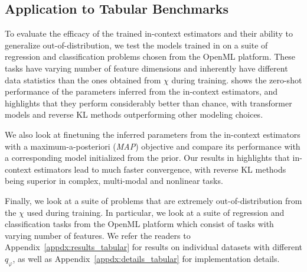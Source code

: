 \vspace{-3mm}
\subsection{Application to Tabular Benchmarks}
\vspace{-1mm}
\label{subsec:tabular}
To evaluate the efficacy of the trained in-context estimators and their ability to generalize out-of-distribution, we test the models trained in  on a suite of regression and classification problems chosen from the OpenML platform. These tasks have varying number of feature dimensions and inherently have different data statistics than the ones obtained from $\chi$ during training.  shows the zero-shot performance of the parameters inferred from the in-context estimators, and highlights that they perform considerably better than chance, with transformer models and reverse KL methods outperforming other modeling choices.

We also look at finetuning the inferred parameters from the in-context estimators with a maximum-a-posteriori (\textit{MAP}) objective and compare its performance with a corresponding model initialized from the prior. Our results in  highlights that in-context estimators lead to much faster convergence, with reverse KL methods being superior in complex, multi-modal and nonlinear tasks.

\begin{table}

\end{table}
Finally, we look at a suite of problems that are extremely out-of-distribution from the $\chi$ used during training. In particular, we look at a suite of regression and classification tasks from the OpenML platform which consist of tasks with varying number of features. We refer the readers to Appendix~\ref{appdx:results_tabular} for results on individual datasets with different $q_\varphi$, as well as Appendix~\ref{appdx:details_tabular} for implementation details.

